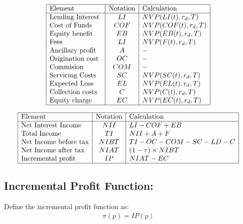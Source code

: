 \renewcommand{\arraystretch}{1.5} %
\begin{center} %
\[ %
\begin{array}{|l|c|l|} \hline %
\mbox{Element} & \mbox{Notation} & \mbox{Calculation}\\ \hline
\mbox{Lending Interest }  & LI & NVP(LI(t),r_d,T)\\
\mbox{Cost of Funds   }  & COF & NVP(COF(t),r_d,T)\\
\mbox{Equity benefit }  & EB & NVP(EB(t),r_d,T)\\
\mbox{Fees }  & LI & NVP(F(t),r_d,T)\\
\mbox{Ancillary profit }  & A & -\\
\mbox{Origination cost}  & OC & -\\
\mbox{Commision  }  & COM & -\\
\mbox{Servicing Costs}  & SC & NVP(SC(t),r_d,T)\\
\mbox{Expected Loss }  & EL & NVP(EL(t),r_d,T)\\
\mbox{Collection costs }  & C & NVP(C(t),r_d,T)\\
\mbox{Equity charge}  & EC & NVP(EC(t),r_d,T)\\

\hline
\end{array} %
\] %
\end{center}

\renewcommand{\arraystretch}{1.5} %
\begin{center} %
\[ %
\begin{array}{|l|c|l|} \hline %
\mbox{Element} & \mbox{Notation} & \mbox{Calculation}\\ \hline
\mbox{Net Interest Income }  & NII & LI-COF+EB\\
\mbox{Total Income  }  & TI & NII+A+F\\
\mbox{Net Income before tax}  & NIBT & TI-OC-COM-SC-LD-C\\
\mbox{Net Income after tax }  & NIAT&(1-\tau)\times NIBT \\
\mbox{Incremental profit  }  & IP & NIAT-EC\\

\hline
\end{array} %
\] %
\end{center}

\subsection{ Incremental Profit Function: }
Define the incremental profit function as:
\begin{align}
\pi(p)=IP(p) \label{eq:IP}
\end{align}

